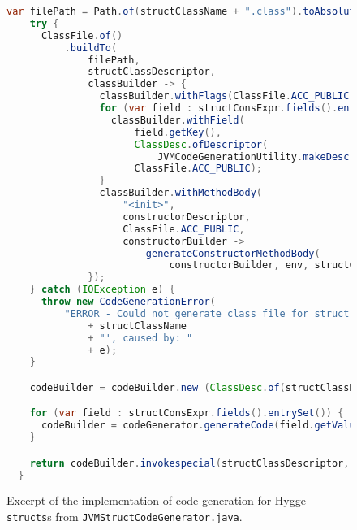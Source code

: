 \begin{figure}[H]
\begin{lstlisting}[language=Java]
    var filePath = Path.of(structClassName + ".class").toAbsolutePath();
    try {
      ClassFile.of()
          .buildTo(
              filePath,
              structClassDescriptor,
              classBuilder -> {
                classBuilder.withFlags(ClassFile.ACC_PUBLIC);
                for (var field : structConsExpr.fields().entrySet()) {
                  classBuilder.withField(
                      field.getKey(),
                      ClassDesc.ofDescriptor(
                          JVMCodeGenerationUtility.makeDescriptor(field.getValue().type(), env)),
                      ClassFile.ACC_PUBLIC);
                }
                classBuilder.withMethodBody(
                    "<init>",
                    constructorDescriptor,
                    ClassFile.ACC_PUBLIC,
                    constructorBuilder ->
                        generateConstructorMethodBody(
                            constructorBuilder, env, structConsExpr, structClassName));
              });
    } catch (IOException e) {
      throw new CodeGenerationError(
          "ERROR - Could not generate class file for struct '"
              + structClassName
              + "', caused by: "
              + e);
    }

    codeBuilder = codeBuilder.new_(ClassDesc.of(structClassName)).dup();

    for (var field : structConsExpr.fields().entrySet()) {
      codeBuilder = codeGenerator.generateCode(field.getValue(), env, codeBuilder);
    }

    return codeBuilder.invokespecial(structClassDescriptor, "<init>", constructorDescriptor);
  }
  \end{lstlisting}
  \caption{Excerpt of the implementation of code generation for Hygge \texttt{structs}s from \texttt{JVMStructCodeGenerator.java}.}
  \label{fig:jvm_struct_builder}
\end{figure}
